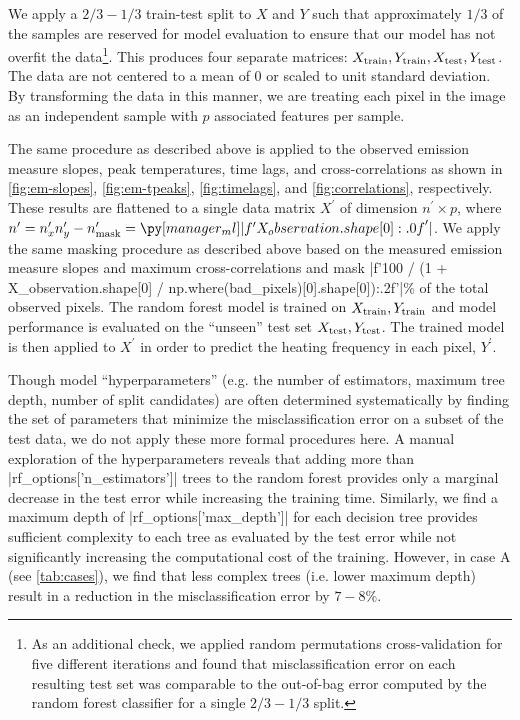We apply a $2/3-1/3$ train-test split to $X$ and $Y$ such that approximately $1/3$ of the samples are reserved for model evaluation to ensure that our model has not overfit the data\footnote{As an additional check, we applied random permutations cross-validation for five different iterations and found that misclassification error on each resulting test set was comparable to the out-of-bag error computed by the random forest classifier for a single $2/3-1/3$ split.}.
This produces four separate matrices: $X_\textup{train},Y_\textup{train},X_\textup{test},Y_\textup{test}$.
The data are not centered to a mean of 0 or scaled to unit standard deviation.
By transforming the data in this manner, we are treating each pixel in the image as an independent sample with $p$ associated features per sample.

The same procedure as described above is applied to the observed emission measure slopes, peak temperatures, time lags, and cross-correlations as shown in \autoref{fig:em-slopes}, \autoref{fig:em-tpeaks}, \autoref{fig:timelags}, and \autoref{fig:correlations}, respectively.
These results are flattened to a single data matrix $X^\prime$ of dimension $n^\prime\times p$, where $n^\prime=n_x^\prime n_y^\prime - n^\prime_\textup{mask}=\py[manager_ml]|f'{X_observation.shape[0]:.0f}'|$.
We apply the same masking procedure as described above based on the measured emission measure slopes and maximum cross-correlations and mask \py[manager_ml]|f'{100 / (1 + X_observation.shape[0] / np.where(bad_pixels)[0].shape[0]):.2f}'|$\%$ of the total observed pixels.
The random forest model is trained on $X_\textup{train},Y_\textup{train}$ and model performance is evaluated on the ``unseen'' test set $X_\textup{test},Y_\textup{test}$.
The trained model is then applied to $X^\prime$ in order to predict the heating frequency in each pixel, $Y^\prime$.

Though model ``hyperparameters'' (e.g. the number of estimators, maximum tree depth, number of split candidates) are often determined systematically by finding the set of parameters that minimize the misclassification error on a subset of the test data, we do not apply these more formal procedures here.
A manual exploration of the hyperparameters reveals that adding more than \py[manager_ml]|rf_options['n_estimators']| trees to the random forest provides only a marginal decrease in the test error while increasing the training time.
Similarly, we find a maximum depth of \py[manager_ml]|rf_options['max_depth']| for each decision tree provides sufficient complexity to each tree as evaluated by the test error while not significantly increasing the computational cost of the training.
However, in case A (see \autoref{tab:cases}), we find that less complex trees (i.e. lower maximum depth) result in a reduction in the misclassification error by $7-8\%$.

